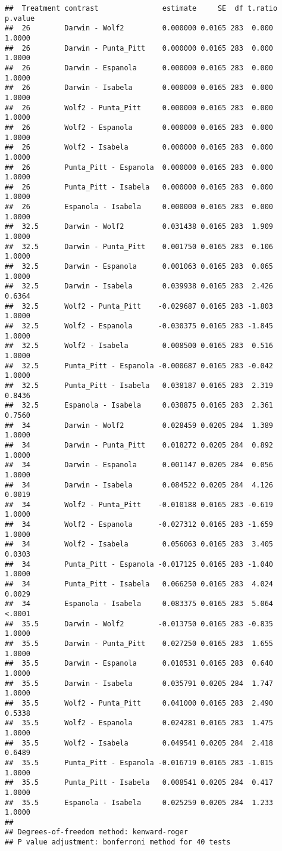 \documentclass[
]{article}
\begin{document}
\begin{verbatim}
##  Treatment contrast               estimate     SE  df t.ratio p.value
##  26        Darwin - Wolf2         0.000000 0.0165 283  0.000  1.0000 
##  26        Darwin - Punta_Pitt    0.000000 0.0165 283  0.000  1.0000 
##  26        Darwin - Espanola      0.000000 0.0165 283  0.000  1.0000 
##  26        Darwin - Isabela       0.000000 0.0165 283  0.000  1.0000 
##  26        Wolf2 - Punta_Pitt     0.000000 0.0165 283  0.000  1.0000 
##  26        Wolf2 - Espanola       0.000000 0.0165 283  0.000  1.0000 
##  26        Wolf2 - Isabela        0.000000 0.0165 283  0.000  1.0000 
##  26        Punta_Pitt - Espanola  0.000000 0.0165 283  0.000  1.0000 
##  26        Punta_Pitt - Isabela   0.000000 0.0165 283  0.000  1.0000 
##  26        Espanola - Isabela     0.000000 0.0165 283  0.000  1.0000 
##  32.5      Darwin - Wolf2         0.031438 0.0165 283  1.909  1.0000 
##  32.5      Darwin - Punta_Pitt    0.001750 0.0165 283  0.106  1.0000 
##  32.5      Darwin - Espanola      0.001063 0.0165 283  0.065  1.0000 
##  32.5      Darwin - Isabela       0.039938 0.0165 283  2.426  0.6364 
##  32.5      Wolf2 - Punta_Pitt    -0.029687 0.0165 283 -1.803  1.0000 
##  32.5      Wolf2 - Espanola      -0.030375 0.0165 283 -1.845  1.0000 
##  32.5      Wolf2 - Isabela        0.008500 0.0165 283  0.516  1.0000 
##  32.5      Punta_Pitt - Espanola -0.000687 0.0165 283 -0.042  1.0000 
##  32.5      Punta_Pitt - Isabela   0.038187 0.0165 283  2.319  0.8436 
##  32.5      Espanola - Isabela     0.038875 0.0165 283  2.361  0.7560 
##  34        Darwin - Wolf2         0.028459 0.0205 284  1.389  1.0000 
##  34        Darwin - Punta_Pitt    0.018272 0.0205 284  0.892  1.0000 
##  34        Darwin - Espanola      0.001147 0.0205 284  0.056  1.0000 
##  34        Darwin - Isabela       0.084522 0.0205 284  4.126  0.0019 
##  34        Wolf2 - Punta_Pitt    -0.010188 0.0165 283 -0.619  1.0000 
##  34        Wolf2 - Espanola      -0.027312 0.0165 283 -1.659  1.0000 
##  34        Wolf2 - Isabela        0.056063 0.0165 283  3.405  0.0303 
##  34        Punta_Pitt - Espanola -0.017125 0.0165 283 -1.040  1.0000 
##  34        Punta_Pitt - Isabela   0.066250 0.0165 283  4.024  0.0029 
##  34        Espanola - Isabela     0.083375 0.0165 283  5.064  <.0001 
##  35.5      Darwin - Wolf2        -0.013750 0.0165 283 -0.835  1.0000 
##  35.5      Darwin - Punta_Pitt    0.027250 0.0165 283  1.655  1.0000 
##  35.5      Darwin - Espanola      0.010531 0.0165 283  0.640  1.0000 
##  35.5      Darwin - Isabela       0.035791 0.0205 284  1.747  1.0000 
##  35.5      Wolf2 - Punta_Pitt     0.041000 0.0165 283  2.490  0.5338 
##  35.5      Wolf2 - Espanola       0.024281 0.0165 283  1.475  1.0000 
##  35.5      Wolf2 - Isabela        0.049541 0.0205 284  2.418  0.6489 
##  35.5      Punta_Pitt - Espanola -0.016719 0.0165 283 -1.015  1.0000 
##  35.5      Punta_Pitt - Isabela   0.008541 0.0205 284  0.417  1.0000 
##  35.5      Espanola - Isabela     0.025259 0.0205 284  1.233  1.0000 
## 
## Degrees-of-freedom method: kenward-roger 
## P value adjustment: bonferroni method for 40 tests
\end{verbatim}
\end{document}
